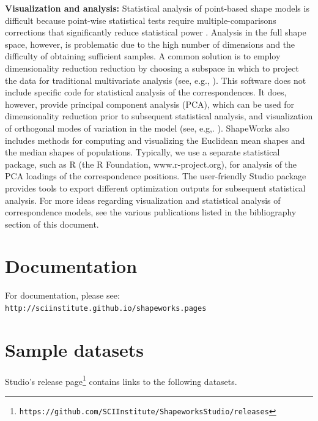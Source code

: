 \documentclass[letterpaper,12pt]{article}   %
\begin{document}
\vspace{0.1in}
\noindent\textbf{Visualization and analysis:} Statistical analysis of point-based shape models is difficult because point-wise statistical tests require multiple-comparisons corrections that significantly reduce statistical power \cite{cates2008hypothesis}. Analysis in the full shape space, however, is problematic due to the high number of dimensions and the difficulty of obtaining sufficient samples. A common solution is to employ dimensionality reduction reduction by choosing a subspace in which to project the data for traditional multivariate analysis (see, e.g., \cite{cates2008particle,cates2008hypothesis}). This software does not include specific code for statistical analysis of the correspondences. It does, however, provide principal component analysis (PCA), which can be used for dimensionality reduction prior to subsequent statistical analysis, and visualization of orthogonal modes of variation in the model (see, e.g,. \cite{cates2008particle,cates2008hypothesis}). ShapeWorks also includes methods for computing and visualizing the Euclidean mean shapes and the median shapes of populations. Typically, we use a separate statistical package, such as R (the R Foundation, www.r-project.org), for analysis of the PCA loadings of the correspondence positions. The user-friendly Studio package provides tools to export different optimization outputs for subsequent statistical analysis. For more ideas regarding visualization and statistical analysis of correspondence models, see the various publications listed in the bibliography section of this document.


\section{Documentation}
For documentation, please see: \texttt{http://sciinstitute.github.io/shapeworks.pages}

\section{Sample datasets}

Studio's release page\footnote{\texttt{https://github.com/SCIInstitute/ShapeworksStudio/releases}} contains links to the following datasets.
\end{document}
